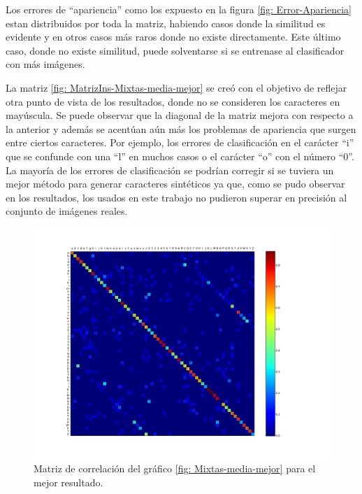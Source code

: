 	Los errores de ``apariencia'' como los expuesto en la figura \ref{fig: Error-Apariencia} estan distribuidos por toda la matriz, habiendo casos donde la similitud es evidente y en otros casos más raros donde no existe directamente. Este último caso, donde no existe similitud, puede solventarse si se entrenase al clasificador con más imágenes.
	
	La matriz \ref{fig: MatrizIns-Mixtas-media-mejor} se creó con el objetivo de reflejar otra punto de vista de los resultados, donde no se consideren los caracteres en mayúscula. Se puede observar que la diagonal de la matriz mejora con respecto a la anterior y además se acentúan aún más los problemas de apariencia que surgen entre ciertos caracteres. Por ejemplo, los errores de clasificación en el carácter ``i'' que se confunde con una ``l'' en muchos casos o el carácter ``o'' con el número ``0''. La mayoría de los errores de clasificación se podrían corregir si se tuviera un mejor método para generar caracteres sintéticos ya que, como se pudo observar en los resultados, los usados en este trabajo no pudieron superar en precisión al conjunto de imágenes reales.
	
	
		
			\begin{figure}[!htbp]
				\centerline{\includegraphics[scale=0.4]{img/resultados/mixtas/best_mean_matrix_Alpha0,01_2040-4.png}}
				\caption[Mixtas Matriz expon]{Matriz de correlación del gráfico \ref{fig: Mixtas-media-mejor} para el mejor resultado. }
				\label{fig: Mixtas-Matrix-media-mejor}
			\end{figure}
	
